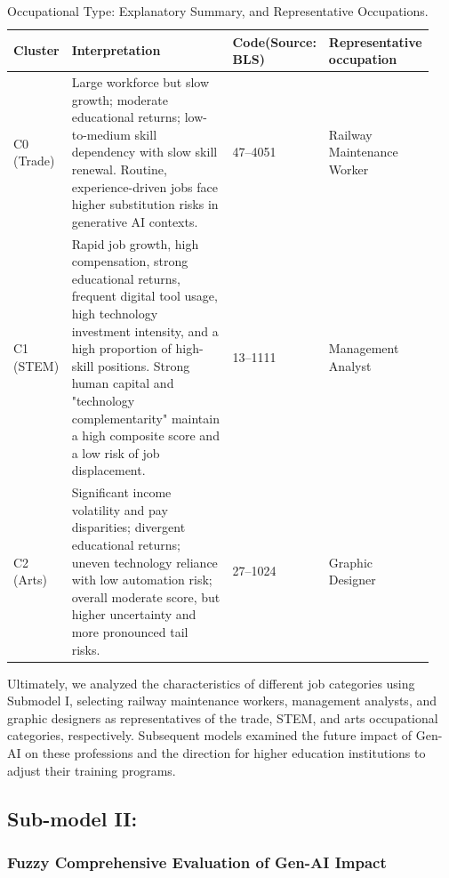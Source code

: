 \documentclass{mcmthesis}
\begin{document}
\begin{table}[H]  %
\centering
\caption{Occupational Type: Explanatory Summary, and Representative Occupations.}
\label{tab:cluster_profile}
\begin{tabular}{p{0.12\linewidth} p{0.52\linewidth} p{0.12\linewidth} p{0.18\linewidth}}
\hline
Cluster & Interpretation & Code(Source: BLS\cite{BLS}) & Representative occupation \\
\hline
C0 (Trade) &
Large workforce but slow growth; moderate educational returns; low-to-medium skill dependency with slow skill renewal. Routine, experience-driven jobs face higher substitution risks in generative AI contexts. &
47--4051 &
Railway Maintenance Worker \\
\hline
C1 (STEM) &
Rapid job growth, high compensation, strong educational returns, frequent digital tool usage, high technology investment intensity, and a high proportion of high-skill positions. Strong human capital and "technology complementarity" maintain a high composite score and a low risk of job displacement. &
13--1111 &
Management Analyst \\
\hline
C2 (Arts) &
Significant income volatility and pay disparities; divergent educational returns; uneven technology reliance with low automation risk; overall moderate score, but higher uncertainty and more pronounced tail risks. &
27--1024 &
Graphic Designer \\
\hline
\end{tabular}
\end{table}

Ultimately, we analyzed the characteristics of different job categories using Submodel I, selecting railway maintenance workers, management analysts, and graphic designers as representatives of the trade, STEM, and arts occupational categories, respectively. Subsequent models examined the future impact of Gen-AI on these professions and the direction for higher education institutions to adjust their training programs.

\subsection{Sub-model II:}
\subsubsection{Fuzzy Comprehensive Evaluation of Gen-AI Impact}
\end{document}
